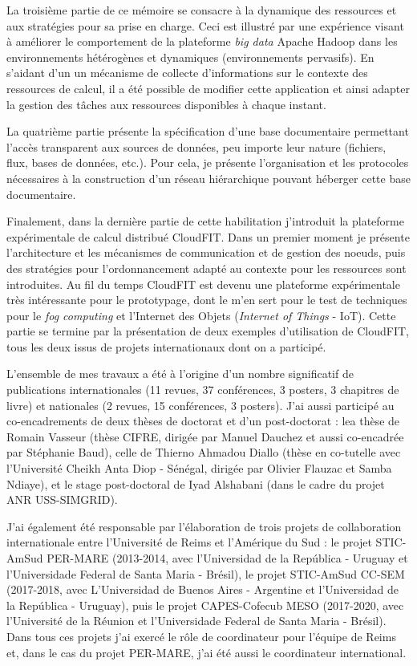 La troisième partie de ce mémoire se consacre à la dynamique des ressources et aux stratégies pour sa prise en charge. Ceci est illustré par une expérience visant à améliorer le comportement de la plateforme \textit{big data} Apache Hadoop dans les environnements hétérogènes et dynamiques (environnements pervasifs). En s'aidant d'un un mécanisme de collecte d'informations sur le contexte des ressources de calcul, il a été possible de modifier cette application et ainsi adapter la gestion des tâches aux ressources disponibles à chaque instant. 

La quatrième partie présente la spécification d'une base documentaire permettant l'accès transparent aux sources de données, peu importe leur nature (fichiers, flux, bases de données, etc.). Pour cela, je présente l'organisation et les protocoles nécessaires à la construction d'un réseau hiérarchique pouvant héberger cette base documentaire.

Finalement, dans la dernière partie de cette habilitation j'introduit la plateforme expérimentale de calcul distribué CloudFIT. Dans un premier moment je présente l'architecture et les mécanismes de communication et de gestion des n{oe}uds, puis des stratégies pour l'ordonnancement adapté au contexte pour les ressources sont introduites. Au fil du temps CloudFIT est devenu une plateforme expérimentale très intéressante pour le prototypage, dont le m'en sert pour le test de techniques pour le \textit{fog computing} et l'Internet des Objets (\textit{Internet of Things} - IoT). Cette partie se termine par la présentation de deux exemples d'utilisation de CloudFIT, tous les deux issus de projets internationaux dont on a participé.

L'ensemble de mes travaux a été à l'origine d'un nombre significatif de publications internationales (11 revues, 37 conférences, 3 posters, 3 chapitres de livre) et nationales (2 revues, 15 conférences, 3 posters). J'ai aussi participé au co-encadrements de deux thèses de doctorat et d'un post-doctorat : lea thèse de Romain Vasseur (thèse CIFRE, dirigée par Manuel Dauchez et aussi co-encadrée par Stéphanie Baud), celle de Thierno Ahmadou Diallo (thèse en co-tutelle avec l'Université Cheikh Anta Diop - Sénégal, dirigée par Olivier Flauzac et Samba Ndiaye), et le stage post-doctoral de Iyad Alshabani (dans le cadre du projet ANR USS-SIMGRID). 

J'ai également été responsable par l'élaboration de trois projets de collaboration internationale entre l'Université de Reims et l'Amérique du Sud : le projet STIC-AmSud PER-MARE (2013-2014, avec l'Universidad de la República - Uruguay et l'Universidade Federal de Santa Maria - Brésil), le projet STIC-AmSud CC-SEM (2017-2018, avec L'Universidad de Buenos Aires - Argentine et l'Universidad de la República - Uruguay), puis le projet CAPES-Cofecub MESO (2017-2020, avec l'Université de la Réunion et  l'Universidade Federal de Santa Maria - Brésil). Dans tous ces projets j'ai exercé le rôle de coordinateur pour l'équipe de Reims et, dans le cas du projet PER-MARE, j'ai été aussi le coordinateur international.

